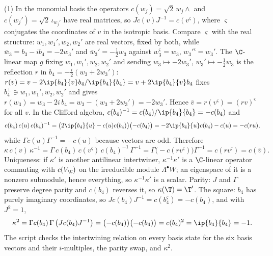 (1) In the monomial basis the operators $c(w_j) = \sqrt2\,w_j\wedge$ and $c(w_j') = \sqrt2\,\iota_{w_j'}$ have real matrices, so $J c(v) J^{-1} = c(v^\varsigma)$, where $\varsigma$ conjugates the coordinates of $v$ in the isotropic basis. Compare $\varsigma$ with the real structure: $w_1, w_1', w_2, w_2'$ are real vectors, fixed by both, while $\bar w_3 = b_3 - ib_4 = -2w_3'$ and $\bar w_3' = -\tfrac12 w_3$ against $w_3^\varsigma = w_3$, $w_3'^\varsigma = w_3'$. The $\C$-linear map $g$ fixing $w_1, w_1', w_2, w_2'$ and sending $w_3 \mapsto -2w_3'$, $w_3' \mapsto -\tfrac12 w_3$ is the reflection $r$ in $b_4 = -\tfrac{i}{2}(w_3 + 2w_3')$: $r(v) = v - 2\ip{b_4}{v}b_4/\ip{b_4}{b_4} = v + 2\ip{b_4}{v}b_4$ fixes $b_4^\perp \ni w_1, w_1', w_2, w_2'$ and gives $r(w_3) = w_3 - 2i\,b_4 = w_3 - (w_3 + 2w_3') = -2w_3'$. Hence $\bar v = r(v^\varsigma) = (rv)^\varsigma$ for all $v$. In the Clifford algebra, $c(b_4)^{-1} = c(b_4)/\ip{b_4}{b_4} = -c(b_4)$ and
\[
c(b_4)\,c(u)\,c(b_4)^{-1} = \bigl(2\ip{b_4}{u} - c(u)c(b_4)\bigr)\bigl(-c(b_4)\bigr) = -2\ip{b_4}{u}c(b_4) - c(u) = -c(ru),
\]
while $\Gamma c(u)\Gamma^{-1} = -c(u)$ because vectors are odd. Therefore
\[
\kappa\,c(v)\,\kappa^{-1} = \Gamma\,c(b_4)\,c(v^\varsigma)\,c(b_4)^{-1}\,\Gamma^{-1} = \Gamma\bigl(-c(r v^\varsigma)\bigr)\Gamma^{-1} = c(r v^\varsigma) = c(\bar v).
\]
Uniqueness: if $\kappa'$ is another antilinear intertwiner, $\kappa^{-1}\kappa'$ is a $\C$-linear operator commuting with $c(V_\C)$ on the irreducible module $\Lambda^\bullet W$; an eigenspace of it is a nonzero submodule, hence everything, so $\kappa^{-1}\kappa'$ is a scalar. Parity: $J$ and $\Gamma$ preserve degree parity and $c(b_4)$ reverses it, so $\kappa(\T) = \T'$. The square: $b_4$ has purely imaginary coordinates, so $J c(b_4) J^{-1} = c(b_4^\varsigma) = -c(b_4)$, and with $J^2 = 1$,
\[
\kappa^2 = \Gamma c(b_4)\,\Gamma\,\bigl(J c(b_4) J^{-1}\bigr) = \bigl(-c(b_4)\bigr)\bigl(-c(b_4)\bigr) = c(b_4)^2 = \ip{b_4}{b_4} = -1 .
\]
The script checks the intertwining relation on every basis state for the six basis vectors and their $i$-multiples, the parity swap, and $\kappa^2$.


